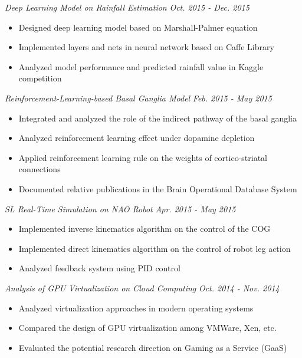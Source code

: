 \documentclass[margin]{res}
\begin{document}
\begin{resume}
{\em Deep Learning Model on Rainfall Estimation} \hfill {\em Oct. 2015 - Dec. 2015} \\[-8pt]
\begin{itemize}[topsep=-1pt,parsep=1pt]
\item Designed deep learning model based on Marshall-Palmer equation
\item Implemented layers and nets in neural network based on Caffe Library
\item Analyzed model performance and predicted rainfall value in Kaggle competition
\end{itemize}

{\em Reinforcement-Learning-based Basal Ganglia Model} \hfill {\em Feb. 2015 - May 2015} \\[-8pt]
\begin{itemize}[topsep=-1pt,parsep=1pt]
\item Integrated and analyzed the role of the indirect pathway of the basal ganglia
\item Analyzed reinforcement learning effect under dopamine depletion
\item Applied reinforcement learning rule on the weights of cortico-striatal connections
\item Documented relative publications in the Brain Operational Database System
\end{itemize}

{\em SL Real-Time Simulation on NAO Robot} \hfill {\em Apr. 2015 - May 2015} \\[-8pt]
\begin{itemize}[topsep=-1pt,parsep=1pt]
\item Implemented inverse kinematics algorithm on the control of the COG
\item Implemented direct kinematics algorithm on the control of robot leg action
\item Analyzed feedback system using PID control
\end{itemize}

{\em Analysis of GPU Virtualization on Cloud Computing} \hfill {\em Oct. 2014 - Nov. 2014} \\[-8pt]
\begin{itemize}[topsep=-1pt,parsep=1pt]
\item Analyzed virtualization approaches in modern operating systems
\item Compared the design of GPU virtualization among VMWare, Xen, etc.
\item Evaluated the potential research direction on Gaming as a Service (GaaS)
\end{itemize}


\end{resume}
\end{document}

